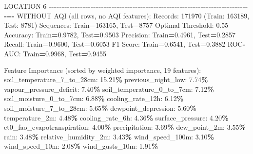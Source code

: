 \documentclass[
  letterpaper,
  DIV=11,
  numbers=noendperiod]{scrartcl}
\newenvironment{Shaded}{\begin{snugshade}}{\end{snugshade}}
\newcommand{\BuiltInTok}[1]{#1}
\newcommand{\DecValTok}[1]{\textcolor[rgb]{0.00,0.00,0.81}{#1}}
\newcommand{\FloatTok}[1]{\textcolor[rgb]{0.00,0.00,0.81}{#1}}
\newcommand{\NormalTok}[1]{#1}
\newcommand{\OperatorTok}[1]{\textcolor[rgb]{0.81,0.36,0.00}{\textbf{#1}}}
\begin{document}
\begin{Shaded}
\begin{Highlighting}[]
\NormalTok{LOCATION }\DecValTok{6}
\OperatorTok{{-}{-}{-}{-}{-}{-}{-}{-}{-}{-}{-}{-}{-}{-}{-}{-}{-}{-}{-}{-}{-}{-}{-}{-}{-}{-}{-}{-}{-}{-}{-}{-}{-}{-}{-}{-}{-}{-}{-}{-}{-}{-}{-}{-}{-}{-}{-}{-}{-}{-}{-}{-}{-}{-}{-}{-}{-}{-}{-}{-}{-}{-}{-}{-}{-}{-}{-}{-}{-}{-}{-}{-}{-}{-}{-}{-}{-}{-}{-}{-}}
\NormalTok{WITHOUT AQI (}\BuiltInTok{all}\NormalTok{ rows, no AQI features):}
\NormalTok{  Records: }\DecValTok{171970}\NormalTok{ (Train: }\DecValTok{163189}\NormalTok{, Test: }\DecValTok{8781}\NormalTok{)}
\NormalTok{  Sequences: Train}\OperatorTok{=}\DecValTok{163165}\NormalTok{, Test}\OperatorTok{=}\DecValTok{8757}
\NormalTok{  Optimal Threshold: }\FloatTok{0.55}
\NormalTok{  Accuracy: Train}\OperatorTok{=}\FloatTok{0.9782}\NormalTok{, Test}\OperatorTok{=}\FloatTok{0.9503}
\NormalTok{  Precision: Train}\OperatorTok{=}\FloatTok{0.4961}\NormalTok{, Test}\OperatorTok{=}\FloatTok{0.2857}
\NormalTok{  Recall: Train}\OperatorTok{=}\FloatTok{0.9600}\NormalTok{, Test}\OperatorTok{=}\FloatTok{0.6053}
\NormalTok{  F1 Score: Train}\OperatorTok{=}\FloatTok{0.6541}\NormalTok{, Test}\OperatorTok{=}\FloatTok{0.3882}
\NormalTok{  ROC}\OperatorTok{{-}}\NormalTok{AUC: Train}\OperatorTok{=}\FloatTok{0.9968}\NormalTok{, Test}\OperatorTok{=}\FloatTok{0.9455}

\NormalTok{  Feature Importance (}\BuiltInTok{sorted}\NormalTok{ by weighted importance, }\DecValTok{19}\NormalTok{ features):}
\NormalTok{    soil\_temperature\_7\_to\_28cm: }\FloatTok{15.21}\OperatorTok{\%}
\NormalTok{    previous\_night\_low: }\FloatTok{7.74}\OperatorTok{\%}
\NormalTok{    vapour\_pressure\_deficit: }\FloatTok{7.40}\OperatorTok{\%}
\NormalTok{    soil\_temperature\_0\_to\_7cm: }\FloatTok{7.12}\OperatorTok{\%}
\NormalTok{    soil\_moisture\_0\_to\_7cm: }\FloatTok{6.88}\OperatorTok{\%}
\NormalTok{    cooling\_rate\_12h: }\FloatTok{6.12}\OperatorTok{\%}
\NormalTok{    soil\_moisture\_7\_to\_28cm: }\FloatTok{5.65}\OperatorTok{\%}
\NormalTok{    dewpoint\_depression: }\FloatTok{5.60}\OperatorTok{\%}
\NormalTok{    temperature\_2m: }\FloatTok{4.48}\OperatorTok{\%}
\NormalTok{    cooling\_rate\_6h: }\FloatTok{4.36}\OperatorTok{\%}
\NormalTok{    surface\_pressure: }\FloatTok{4.20}\OperatorTok{\%}
\NormalTok{    et0\_fao\_evapotranspiration: }\FloatTok{4.00}\OperatorTok{\%}
\NormalTok{    precipitation: }\FloatTok{3.69}\OperatorTok{\%}
\NormalTok{    dew\_point\_2m: }\FloatTok{3.55}\OperatorTok{\%}
\NormalTok{    rain: }\FloatTok{3.48}\OperatorTok{\%}
\NormalTok{    relative\_humidity\_2m: }\FloatTok{3.43}\OperatorTok{\%}
\NormalTok{    wind\_speed\_100m: }\FloatTok{3.10}\OperatorTok{\%}
\NormalTok{    wind\_speed\_10m: }\FloatTok{2.08}\OperatorTok{\%}
\NormalTok{    wind\_gusts\_10m: }\FloatTok{1.91}\OperatorTok{\%}


\end{Highlighting}
\end{Shaded}
\end{document}
